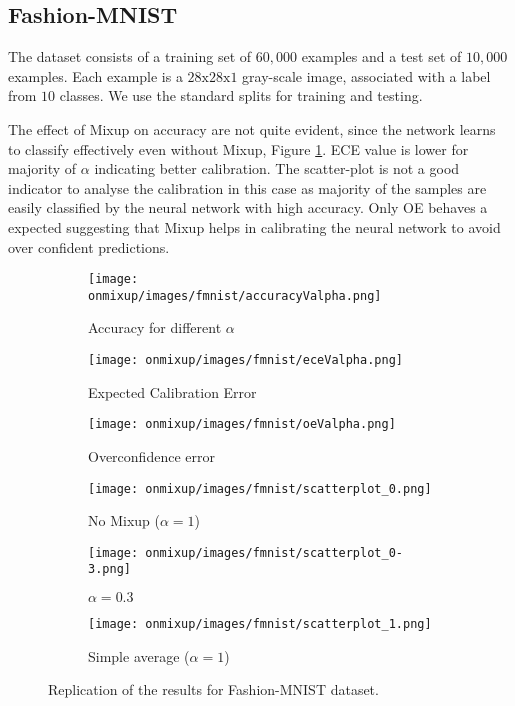 \documentclass{article}
\begin{document}
\subsection{Fashion-MNIST}
The dataset consists of a training set of $60,000$ examples and a test set of $10,000$ examples. Each example is a $28\text{x}28\text{x}1$ gray-scale image, associated with a label from $10$ classes. We use the standard splits for training and testing. 

The effect of Mixup on accuracy are not quite evident, since the network learns to classify effectively even without Mixup, Figure \ref{fig:fmnist}. ECE value is lower for majority of $\alpha$ indicating better calibration. The scatter-plot is not a good indicator to analyse the calibration in this case as majority of the samples are easily classified by the neural network with high accuracy. Only OE behaves a expected suggesting that Mixup helps in calibrating the neural network to avoid over confident predictions.    
\begin{figure}[h]
     \centering
     \begin{subfigure}[b]{0.31\textwidth}
         \centering
         \texttt{[image: onmixup/images/fmnist/accuracyValpha.png]}
         \caption{Accuracy for different $\alpha$}
     \end{subfigure}
     \begin{subfigure}[b]{0.31\textwidth}
         \centering
         \texttt{[image: onmixup/images/fmnist/eceValpha.png]}
         \caption{Expected Calibration Error}
     \end{subfigure}
     \begin{subfigure}[b]{0.31\textwidth}
         \centering
         \texttt{[image: onmixup/images/fmnist/oeValpha.png]}
         \caption{Overconfidence error}
     \end{subfigure}
     \begin{subfigure}[b]{0.31\textwidth}
         \centering
         \noindent\texttt{[image: onmixup/images/fmnist/scatterplot\_0.png]}
         \caption{No Mixup ($\alpha=1$)}
     \end{subfigure}
     \begin{subfigure}[b]{0.31\textwidth}
         \centering
         \noindent\texttt{[image: onmixup/images/fmnist/scatterplot\_0-3.png]}
         \caption{$\alpha=0.3$}
     \end{subfigure}
     \begin{subfigure}[b]{0.31\textwidth}
         \centering
         \noindent\texttt{[image: onmixup/images/fmnist/scatterplot\_1.png]}
         \caption{Simple average ($\alpha=1$)}
     \end{subfigure}
        \caption{Replication of the results for Fashion-MNIST dataset.}
        \label{fig:fmnist}
\end{figure}
\end{document}
